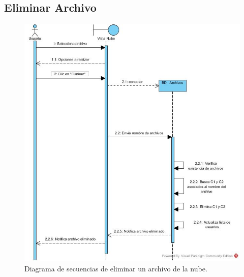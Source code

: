 \subsection{Eliminar Archivo}

\begin{figure}[htbp!]
		\centering
			\includegraphics[width=1\textwidth]{images/Eliminar_Archivo}
		\caption{Diagrama de secuencias de eliminar un archivo de la nube.}
\end{figure} 
\newpage

